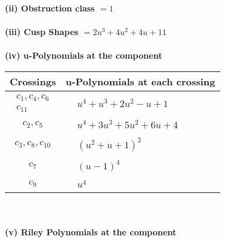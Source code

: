\documentclass[1p]{elsarticle_modified}
\theoremstyle{definition}
\begin{document}
\flushleft \textbf{(ii) Obstruction class $= 1$}\\~\\
\flushleft \textbf{(iii) Cusp Shapes $= 2 u^3+4 u^2+4 u+11$}\\~\\
\newpage\renewcommand{\arraystretch}{1}
\flushleft \textbf{(iv) u-Polynomials at the component}\newline \\
\begin{tabular}{m{50pt}|m{274pt}}
Crossings & \hspace{64pt}u-Polynomials at each crossing \\
\hline $$\begin{aligned}c_{1},c_{4},c_{6}\\c_{11}\end{aligned}$$&$\begin{aligned}
&u^4+u^3+2 u^2- u+1
\end{aligned}$\\
\hline $$\begin{aligned}c_{2},c_{5}\end{aligned}$$&$\begin{aligned}
&u^4+3 u^3+5 u^2+6 u+4
\end{aligned}$\\
\hline $$\begin{aligned}c_{3},c_{8},c_{10}\end{aligned}$$&$\begin{aligned}
&(u^2+u+1)^2
\end{aligned}$\\
\hline $$\begin{aligned}c_{7}\end{aligned}$$&$\begin{aligned}
&(u-1)^4
\end{aligned}$\\
\hline $$\begin{aligned}c_{9}\end{aligned}$$&$\begin{aligned}
&u^4
\end{aligned}$\\
\hline
\end{tabular}\\~\\
\newpage\renewcommand{\arraystretch}{1}
\flushleft \textbf{(v) Riley Polynomials at the component}\newline \\
\end{document}
